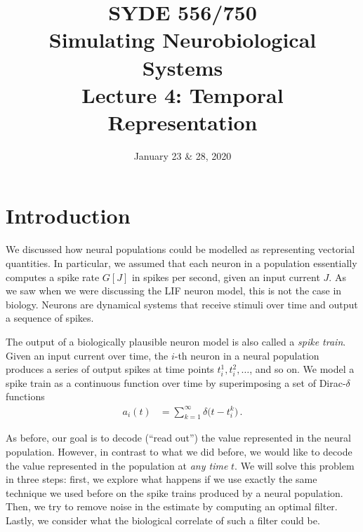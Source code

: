 \documentclass[10pt,letterpaper,oneside]{article}
\date{January 23 \& 28, 2020}
\title{SYDE 556/750 \\ Simulating Neurobiological Systems \\ Lecture 4: Temporal Representation}
\begin{document}

\section{Introduction}


We discussed how neural populations could be modelled as representing vectorial quantities. In particular, we assumed that each neuron in a population essentially computes a spike rate $G[J]$ in spikes per second, given an input current $J$. As we saw when we were discussing the LIF neuron model, this is not the case in biology. Neurons are dynamical systems that receive stimuli over time and output a sequence of spikes.

The output of a biologically plausible neuron model is also called a \emph{spike train}. Given an input current over time, the $i$-th neuron in a neural population produces a series of output spikes at time points $t^1_i, t^2_i, \ldots$, and so on. We model a spike train as a continuous function over time by superimposing a set of Dirac-$\delta$ functions
\begin{align*}
	a_i(t) &= \sum_{k = 1}^\infty \delta\big(t - t^k_i\big) \,.
\end{align*}


As before, our goal is to decode (\enquote{read out}) the value represented in the neural population. However, in contrast to what we did before, we would like to decode the value represented in the population at \emph{any time} $t$. We will solve this problem in three steps: first, we explore what happens if we use exactly the same technique we used before on the spike trains produced by a neural population. Then, we try to remove noise in the estimate by computing an optimal filter. Lastly, we consider what the biological correlate of such a filter could be.
\end{document}
